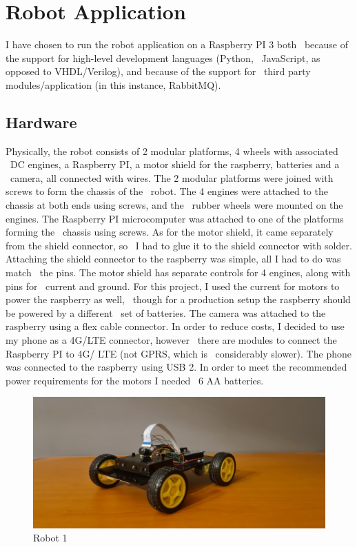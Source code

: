 \section{Robot Application}
\label{sec:robot-application}
I have chosen to run the robot application on a Raspberry PI 3 both \
because of the support for high-level development languages (Python, \
JavaScript, as opposed to VHDL/Verilog), and because of the support for \
third party modules/application (in this instance, RabbitMQ).

\subsection{Hardware}
\label{subsec:implementation-robot-hardware}

Physically, the robot consists of 2 modular platforms, 4 wheels with associated \
DC engines, a Raspberry PI, a motor shield for the raspberry, batteries and a \
camera, all connected with wires.
The 2 modular platforms were joined with screws to form the chassis of the \
robot.
The 4 engines were attached to the chassis at both ends using screws, and the \
rubber wheels were mounted on the engines.
The Raspberry PI microcomputer was attached to one of the platforms forming the \
chassis using screws.
As for the motor shield, it came separately from the shield connector, so \
I had to glue it to the shield connector with solder.
Attaching the shield connector to the raspberry was simple, all I had to do was match \
the pins.
The motor shield has separate controls for 4 engines, along with pins for \
current and ground.
For this project, I used the current for motors to power the raspberry as well, \
though for a production setup the raspberry should be powered by a different \
set of batteries.
The camera was attached to the raspberry using a flex cable connector.
In order to reduce costs, I decided to use my phone as a 4G/LTE connector, however \
there are modules to connect the Raspberry PI to 4G/ LTE (not GPRS, which is \
considerably slower).
The phone was connected to the raspberry using USB 2.
In order to meet the recommended power requirements for the motors I needed \
6 AA batteries.

\begin{figure}[ht]
    \label{fig:robot1}
    \centering
    \includegraphics[keepaspectratio]{img/robot1d.jpg}
    \caption{Robot 1}
\end{figure}

